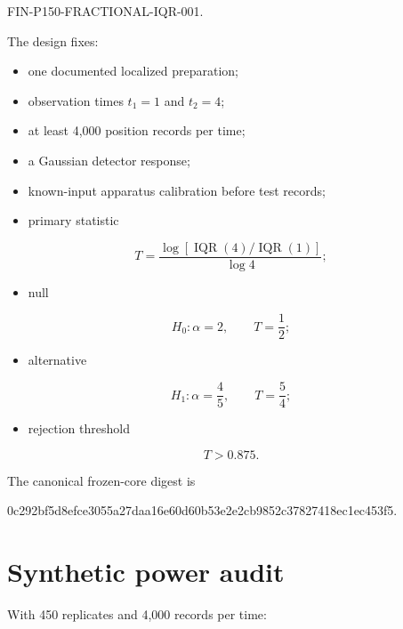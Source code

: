 \documentclass[11pt,a4paper,openany]{report}
\begin{document}
FIN-P150-FRACTIONAL-IQR-001.

The design fixes:

\begin{itemize}
\item 
one documented localized preparation;

\item 
observation times \(t_1=1\) and \(t_2=4\);

\item 
at least 4,000 position records per time;

\item 
a Gaussian detector response;

\item 
known-input apparatus calibration before test records;

\item 
primary statistic

\end{itemize}

\[
T
=
\frac{
\log[\operatorname{IQR}(4)/\operatorname{IQR}(1)]
}{
\log4
};
\]

\begin{itemize}
\item 
null

\end{itemize}

\[
H_0:\alpha=2,\qquad T=\frac12;
\]

\begin{itemize}
\item 
alternative

\end{itemize}

\[
H_1:\alpha=\frac45,\qquad T=\frac54;
\]

\begin{itemize}
\item 
rejection threshold

\end{itemize}

\[
T>0.875.
\]

The canonical frozen-core digest is

0c292bf5d8efce3055a27daa16e60d60b53e2e2cb9852c37827418ec1ec453f5.

\section{Synthetic power audit}

With 450 replicates and 4,000 records per time:
\end{document}
